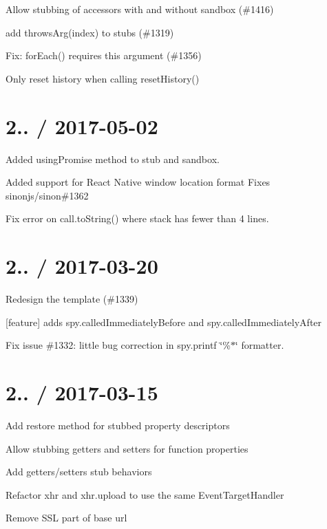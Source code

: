\begin{DoxyItemize}
\item Allow stubbing of accessors with and without sandbox (\#1416)
\item add throws\+Arg(index) to stubs (\#1319)
\item Fix\+: for\+Each() requires \textquotesingle{}this\textquotesingle{} argument (\#1356)
\item Only reset history when calling reset\+History()
\end{DoxyItemize}

\section*{2.. / 2017-\/05-\/02 }


\begin{DoxyItemize}
\item Added {\ttfamily using\+Promise} method to stub and sandbox.
\item Added support for React Native window location format Fixes sinonjs/sinon\#1362
\item Fix error on call.\+to\+String() where stack has fewer than 4 lines.
\end{DoxyItemize}

\section*{2.. / 2017-\/03-\/20 }


\begin{DoxyItemize}
\item Redesign the template (\#1339)
\item \mbox{[}feature\mbox{]} adds spy.\+called\+Immediately\+Before and spy.\+called\+Immediately\+After
\item Fix issue \#1332\+: little bug correction in spy.\+printf \char`\"{}\%$\ast$\char`\"{} formatter.
\end{DoxyItemize}

\section*{2.. / 2017-\/03-\/15 }


\begin{DoxyItemize}
\item Add restore method for stubbed property descriptors
\item Allow stubbing getters and setters for function properties
\item Add getters/setters stub behaviors
\item Refactor xhr and xhr.\+upload to use the same Event\+Target\+Handler
\item Remove S\+SL part of base url
\end{DoxyItemize}

